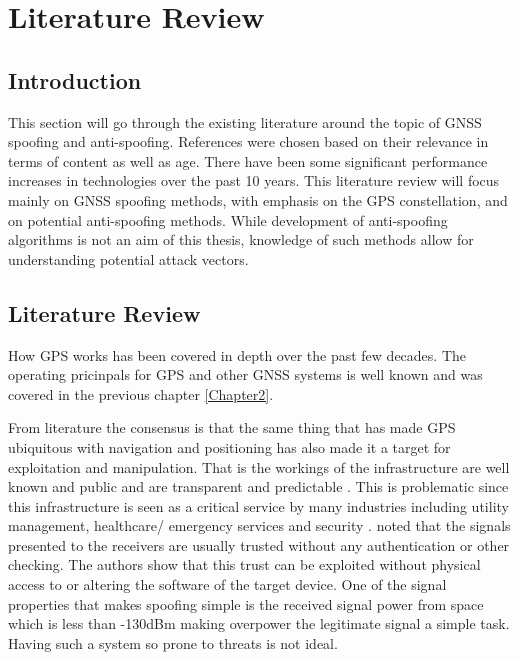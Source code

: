 
\chapter{Literature Review} %

\label{Chapter3} %


\section{Introduction}
This section will go through the existing literature around the topic of GNSS spoofing and anti-spoofing. References were chosen based on their relevance in terms of
content as well as age. There have been some significant performance increases in technologies over the past 10 years.
This literature review will focus mainly on GNSS spoofing methods, with emphasis on the GPS constellation, and on potential anti-spoofing methods. While development of
anti-spoofing algorithms is not an aim of this thesis, knowledge of such methods allow for understanding potential attack vectors.


\section{Literature Review}
How GPS works has been covered in depth over the past few decades. The operating pricinpals for GPS and other GNSS systems is well known and was covered in the previous
chapter \ref{Chapter2}.

From literature the consensus is that the same thing that has made GPS ubiquitous with navigation and 
positioning has also made it a target for exploitation and manipulation. That is the workings
of the infrastructure are well known and public and are transparent and predictable \cite{RN7} \cite{RN4}. This is problematic since this infrastructure
is seen as a critical service by many industries including utility management, healthcare/ emergency services and security \cite{RN12} \cite{RN32}. \textcite{RN28} noted that the signals
presented to the receivers are usually trusted without any authentication or other checking. The authors show that this trust can be exploited without physical access to
or altering the software of the target device. One of the signal properties that makes spoofing simple is the received signal power from space which is less than -130dBm
making overpower the legitimate signal a simple task. Having such a system so prone to threats is not ideal. 

